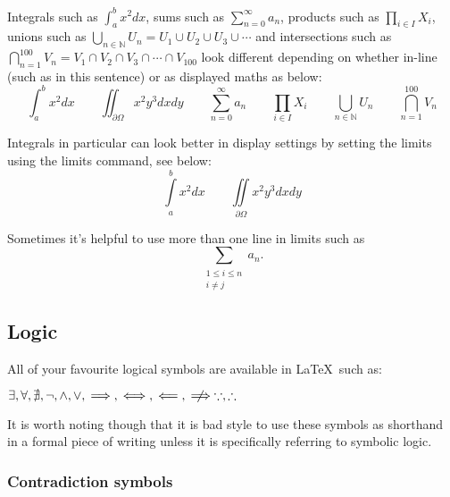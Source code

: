 \documentclass[a4paper,11pt]{article}
\begin{document}
Integrals such as $\int_a^b { x^2 dx}$, %
sums such as $\sum_{n=0}^\infty a_n$, 	%
products such as $\prod_{i \in I} X_i$, %
unions such as $\bigcup_{n\in \mathbb{N}} U_n = U_1 \cup U_2\cup U_3 \cup \cdots$
and intersections such as $\bigcap_{n=1}^{100} V_n = V_1 \cap V_2\cap V_3 \cap \cdots \cap V_{100}$ 
look different depending on whether in-line (such as in this sentence) 
or as displayed maths as below:
\[ 
\int_a^b { x^2 dx}                         \qquad  	%
\iint_{\partial \Omega} { x^2 y^3 dxdy}    \qquad	%
\sum_{n=0}^\infty a_n                      \qquad	%
\prod_{i \in I} X_i                        \qquad	%
\bigcup_{n\in \mathbb{N}} U_n              \qquad	%
\bigcap_{n=1}^{100} V_n 
\]

Integrals in particular can look better in display settings by setting the limits using the limits command, see below:
\[
\int\limits_a^b { x^2 dx} \qquad \iint\limits_{\partial \Omega} { x^2 y^3 dxdy}
\]

Sometimes it's helpful to use more than one line in limits such as
\[
\sum_{\substack{1\leq i\leq n \\ i\neq j}}a_n.
\]
 
\subsection{Logic}

All of your favourite logical symbols are available in \LaTeX \, such as:

$\exists, \forall, 	%
\nexists,  			%
\neg, 				%
\land, \lor,  		%
\implies, \iff, \impliedby, %
\centernot \implies %
\because, \therefore$ 

It is worth noting though that it is bad style to use these symbols as shorthand in a formal piece of writing unless it is specifically referring to symbolic logic.
 

\subsubsection{Contradiction symbols}
\end{document}
